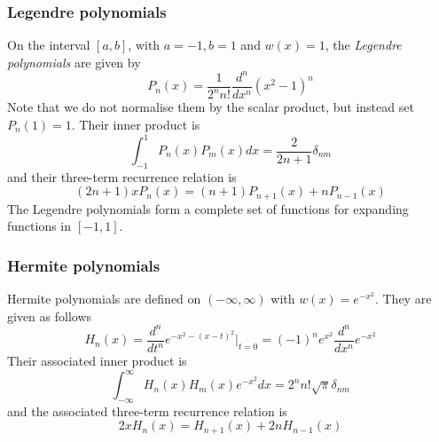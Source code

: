 \documentclass[]{article}
\begin{document}
\subsubsection{Legendre polynomials}
On the interval $[a,b]$, with $a=-1, b=1$ and $w(x)=1$, the \textit{Legendre polynomials} are given by 
\begin{equation} P_{n}(x) = \frac{1}{2^{n}n!}\frac{d^{n}}{dx^{n}}(x^{2}-1)^{n} \end{equation}
Note that we do not normalise them by the scalar product, but instead set $P_{n}(1)=1$.
\newline
\newline
Their inner product is
\begin{equation} \int_{-1}^{1} P_{n}(x)P_{m}(x)dx = \frac{2}{2n+1}\delta_{nm} \end{equation}
and their three-term recurrence relation is
\begin{equation} (2n+1)xP_{n}(x) = (n+1)P_{n+1}(x) + nP_{n-1}(x) \end{equation}
The Legendre polynomials form a complete set of functions for expanding functions in $[-1,1]$.

\subsubsection{Hermite polynomials}
Hermite polynomials are defined on $(-\infty, \infty)$ with $w(x) = e^{-x^{2}}$. They are given as follows
\begin{equation} H_{n}(x) = \frac{d^{n}}{dt^{n}}e^{-x^{2}-(x-t)^{2}}\bigg|_{t=0} = (-1)^{n}e^{x^{2}}\frac{d^{n}}{dx^{n}}e^{-x^{2}} \end{equation}
Their associated inner product is
\begin{equation} \int_{-\infty}^{\infty} H_{n}(x) H_{m}(x) e^{-x^{2}}dx = 2^{n}n!\sqrt{\pi} \delta_{nm} \end{equation}
and the associated three-term recurrence relation is
\begin{equation} 2xH_{n}(x) = H_{n+1}(x) + 2nH_{n-1}(x) \end{equation}
\end{document}
